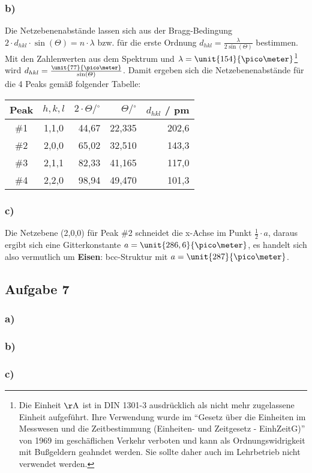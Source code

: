 \documentclass[11pt]{article}
\begin{document}
\subsubsection*{b)}
Die Netzebenenabstände lassen sich aus der Bragg-Bedingung
$2 \cdot d_{hkl} \cdot \sin(\varTheta) = n \cdot \lambda$ bzw. für die erste Ordnung
$d_{hkl} = \frac{\lambda}{2 \sin(\varTheta)}$ bestimmen. Mit den Zahlenwerten aus dem
Spektrum und $\lambda =\unit{154}{\pico \meter}$\footnote{Die Einheit $\mathrm{\AA}$
ist in DIN 1301-3 ausdrücklich als nicht mehr zugelassene Einheit aufgeführt.
Ihre Verwendung wurde im "`Gesetz über die Einheiten im Messwesen und die
Zeitbestimmung (Einheiten- und Zeitgesetz - EinhZeitG)"' von 1969 im
geschäflichen Verkehr verboten und kann als Ordnungswidrigkeit mit
Bußgeldern geahndet werden. Sie sollte daher auch im Lehrbetrieb nicht verwendet werden.}
wird $d_{hkl} = \frac{\unit{77}{\pico \meter}}{\sin(\varTheta)}$.
Damit ergeben sich die Netzebenenabstände für die 4 Peaks gemäß folgender Tabelle:
\begin{table}[htbp]
\begin{center}
\begin{tabular}{|c|c|r|r|r|}
\hline
Peak & $h,k,l$ & $ 2 \cdot \varTheta / { }^\circ $ & $ \varTheta / { }^\circ $
  & $d_{hkl}$ / pm \\ \hline \hline
\#1 & 1,1,0 & 44,67 & 22,335 & 202,6 \\ \hline
\#2 & 2,0,0 & 65,02 & 32,510 & 143,3 \\ \hline
\#3 & 2,1,1 & 82,33 & 41,165 & 117,0 \\ \hline
\#4 & 2,2,0 & 98,94 & 49,470 & 101,3 \\ \hline
\end{tabular}
\end{center}
\label{}
\end{table}

\subsubsection*{c)}
Die Netzebene (2,0,0) für Peak \#2 schneidet die x-Achse im Punkt
$\frac{1}{2} \cdot a$, daraus ergibt sich eine Gitterkonstante
$a = \unit{286,6}{\pico \meter}$, es handelt sich also vermutlich um
\textbf{Eisen}: bcc-Struktur mit $a = \unit{287}{\pico \meter}$.

\subsection*{Aufgabe 7}
\subsubsection*{a)}

\subsubsection*{b)}

\subsubsection*{c)}
\end{document}
